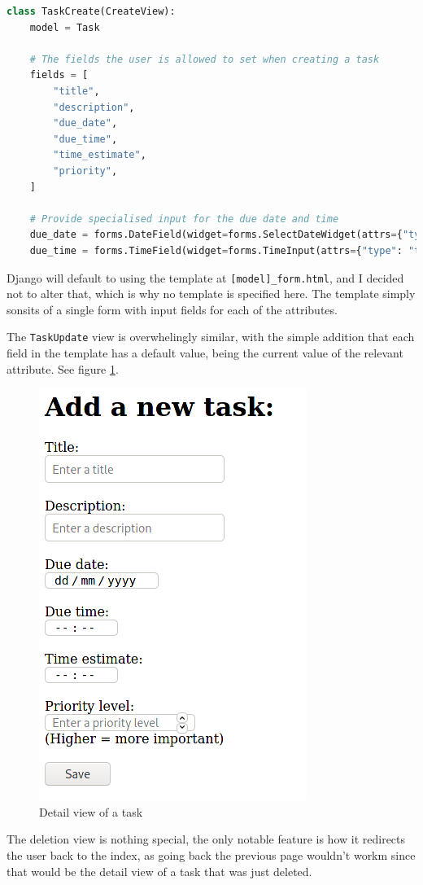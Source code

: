 \documentclass{article}
\begin{document}
\begin{lstlisting}[language=Python]
class TaskCreate(CreateView):
    model = Task

    # The fields the user is allowed to set when creating a task
    fields = [
        "title",
        "description",
        "due_date",
        "due_time",
        "time_estimate",
        "priority",
    ]

    # Provide specialised input for the due date and time
    due_date = forms.DateField(widget=forms.SelectDateWidget(attrs={"type": "date"}))
    due_time = forms.TimeField(widget=forms.TimeInput(attrs={"type": "time"}))
\end{lstlisting}

Django will default to using the template at \texttt{[model]\_form.html},
and I decided not to alter that,
which is why no template is specified here.
The template simply sonsits of a single form with input fields for each of the attributes.

The \texttt{TaskUpdate} view is overwhelingly similar,
with the simple addition that each field in the template has a default value,
being the current value of the relevant attribute.
See figure \ref{fig:task_form1}.

\begin{figure}[H]
	\centering
	\includegraphics[width=0.5\linewidth]{Screenshots/task_form.png}
	\caption{Detail view of a task}
	\label{fig:task_form1}
\end{figure}

The deletion view is nothing special,
the only notable feature is how it redirects the user back to the index,
as going back the previous page wouldn't workm
since that would be the detail view of a task that was just deleted.
\end{document}
